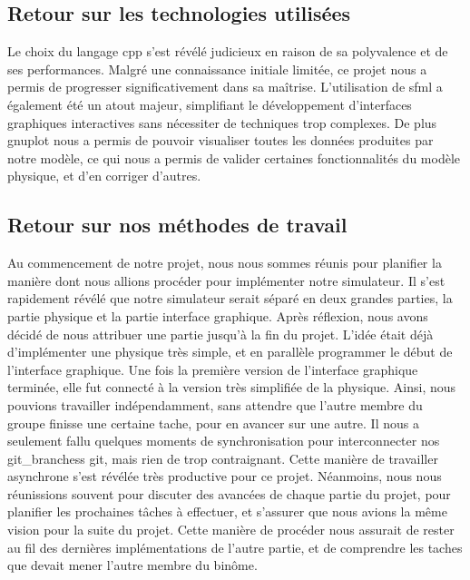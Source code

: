 \subsection{Retour sur les technologies utilisées}\label{subsec:retour-sur-les-technologies-utilisees}
Le choix du langage \gls{cpp} s'est révélé judicieux en raison de sa polyvalence et de ses performances.
Malgré une connaissance initiale limitée, ce projet nous a permis de progresser significativement dans sa maîtrise.
L'utilisation de \gls{sfml} a également été un atout majeur, simplifiant le développement d'interfaces graphiques interactives sans nécessiter de techniques trop complexes.
De plus \gls{gnuplot} nous a permis de pouvoir visualiser toutes les données produites par notre modèle, ce qui nous a permis de valider certaines fonctionnalités du modèle physique, et d'en corriger d'autres.

\subsection{Retour sur nos méthodes de travail}\label{subsec:retour-sur-nos-methodes-de-travail}
Au commencement de notre projet, nous nous sommes réunis pour planifier la manière dont nous allions procéder pour implémenter notre simulateur.
Il s'est rapidement révélé que notre simulateur serait séparé en deux grandes parties, la partie physique et la partie interface graphique.
Après réflexion, nous avons décidé de nous attribuer une partie jusqu'à la fin du projet.
L'idée était déjà d'implémenter une physique très simple, et en parallèle programmer le début de l'interface graphique.
Une fois la première version de l'interface graphique terminée, elle fut connecté à la version très simplifiée de la physique.
Ainsi, nous pouvions travailler indépendamment, sans attendre que l'autre membre du groupe finisse une certaine tache, pour en avancer sur une autre.
Il nous a seulement fallu quelques moments de synchronisation pour interconnecter nos \glspl{git_branches} \gls{git}, mais rien de trop contraignant.
Cette manière de travailler asynchrone s'est révélée très productive pour ce projet.
Néanmoins, nous nous réunissions souvent pour discuter des avancées de chaque partie du projet, pour planifier les prochaines tâches à effectuer, et s'assurer que nous avions la même vision pour la suite du projet.
Cette manière de procéder nous assurait de rester au fil des dernières implémentations de l'autre partie, et de comprendre les taches que devait mener l'autre membre du binôme.

